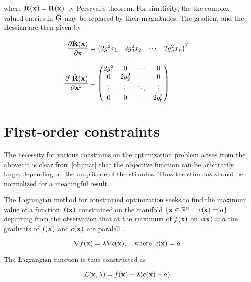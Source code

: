 \documentclass{article}
\newcommand{\Lagr}{\mathcal{L}}
\newcommand{\R}{\mathbb{R}}
\newcommand{\vect}[1]{\textbf{\textrm{#1}}}
\newcommand{\pd}[2]{\frac{\partial {#1}}{\partial {#2}}}
\newcommand{\pdd}[2]{\frac{\partial^2 {#1}}{\partial {#2}}}
\begin{document}
where $\hat{\vect{R}}(\vect{x}) = \vect{R}(\vect{x})$ by Perseval's theorem.
For simplicity, the the complex-valued entries in $\hat{\vect{G}}$ may be replaced by their magnitudes.
The gradient and the Hessian are then given by

\begin{align}
	\pd{\hat{\vect{R}}(\vect{x})}{\vect{x}} & = 
	\begin{pmatrix}
		2 g_1^2 x_1 & 2 g_2^2 x_2 & \cdots & 2 g_n^2 x_n
	\end{pmatrix}^{T} \label{objgradient} \\[1em]
	\pdd{\hat{\vect{R}}(\vect{x})}{\vect{x}^2} & =
	\begin{pmatrix}
		2 g_1^2 & 0 & \cdots & 0 \\
		0 & 2 g_2^2 & \cdots & 0 \\
		\vdots & \vdots\ & \ddots & \vdots \\
		0 & 0 & \cdots & 2g_n^2
	\end{pmatrix} \label{objhessian}
\end{align}

\section{First-order constraints} \label{foc}
The necessity for various constrains on the optimization problem arises from the above: it is clear from \eqref{objmat} that the objective function can be arbitrarily large, depending on the amplitude of the stimulus. 
Thus the stimulus should be normalized for a meaningful result. \par
\hfill \newline
The Lagrangian method for constrained optimization seeks to find the maximum value of a function $f(\vect{x})$ constrained on the manifold $\lbrace \vect{x} \in \R^n \enspace | \enspace c(\vect{x}) = a \rbrace$ departing from the observation that at the maximum of $f(\vect{x})$ on $c(\vect{x}) = a$ the gradients of $f(\vect{x})$ and $c(\vect{x})$ are paralell \citep[ch.12]{nocedal2006}.

\begin{equation*}
	\nabla f(\vect{x}) = \lambda \nabla c(\vect{x}), \quad \text{where} \enspace c(\vect{x}) = a
\end{equation*}

The Lagrangian function is thus constructed as

\begin{equation} \label{lagrangian}
	\Lagr(\vect{x},\lambda) = f(\vect{x}) - \lambda(c(\vect{x}) - a)
\end{equation}
\end{document}

